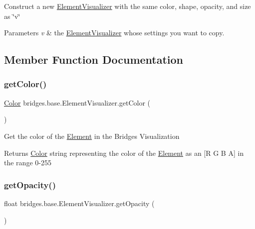 Construct a new \hyperlink{classbridges_1_1base_1_1_element_visualizer}{Element\+Visualizer} with the same color, shape, opacity, and size as \char`\"{}v\char`\"{}


\begin{DoxyParams}{Parameters}
{\em v} & the \hyperlink{classbridges_1_1base_1_1_element_visualizer}{Element\+Visualizer} whose settings you want to copy. \\
\hline
\end{DoxyParams}


\subsection{Member Function Documentation}
\hypertarget{classbridges_1_1base_1_1_element_visualizer_a3bf821b9bfa02746882bac934ce4fb8e}{}\label{classbridges_1_1base_1_1_element_visualizer_a3bf821b9bfa02746882bac934ce4fb8e} 
\subsubsection{\texorpdfstring{get\+Color()}{getColor()}}
{\footnotesize\ttfamily \hyperlink{classbridges_1_1base_1_1_color}{Color} bridges.\+base.\+Element\+Visualizer.\+get\+Color (\begin{DoxyParamCaption}{ }\end{DoxyParamCaption})}

Get the color of the \hyperlink{classbridges_1_1base_1_1_element}{Element} in the Bridges Visualization

\begin{DoxyReturn}{Returns}
\hyperlink{classbridges_1_1base_1_1_color}{Color} string representing the color of the \hyperlink{classbridges_1_1base_1_1_element}{Element} as an \mbox{[}R G B A\mbox{]} in the range 0-\/255 
\end{DoxyReturn}
\hypertarget{classbridges_1_1base_1_1_element_visualizer_ab86ff39f17f8d1766670b18be88b5492}{}\label{classbridges_1_1base_1_1_element_visualizer_ab86ff39f17f8d1766670b18be88b5492} 
\subsubsection{\texorpdfstring{get\+Opacity()}{getOpacity()}}
{\footnotesize\ttfamily float bridges.\+base.\+Element\+Visualizer.\+get\+Opacity (\begin{DoxyParamCaption}{ }\end{DoxyParamCaption})}

